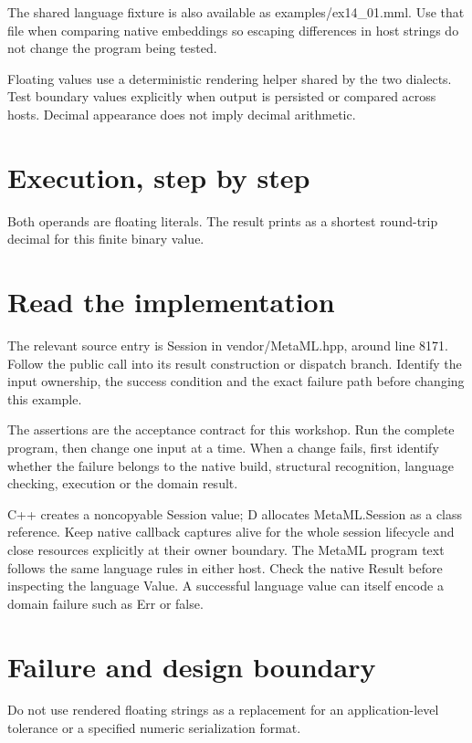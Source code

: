 The shared language fixture is also available as examples/ex14\_01.mml. Use that file when comparing native embeddings so escaping differences in host strings do not change the program being tested.

\clearpage
{}
Floating values use a deterministic rendering helper shared by the two dialects. Test boundary values explicitly when output is persisted or compared across hosts. Decimal appearance does not imply decimal arithmetic.


\section*{Execution, step by step}
Both operands are floating literals. The result prints as a shortest round-trip decimal for this finite binary value.

\section*{Read the implementation}
The relevant source entry is Session in vendor/MetaML.hpp, around line 8171. Follow the public call into its result construction or dispatch branch. Identify the input ownership, the success condition and the exact failure path before changing this example.

The assertions are the acceptance contract for this workshop. Run the complete program, then change one input at a time. When a change fails, first identify whether the failure belongs to the native build, structural recognition, language checking, execution or the domain result.

\clearpage
{}
C++ creates a noncopyable Session value; D allocates MetaML.Session as a class reference. Keep native callback captures alive for the whole session lifecycle and close resources explicitly at their owner boundary. The MetaML program text follows the same language rules in either host. Check the native Result before inspecting the language Value. A successful language value can itself encode a domain failure such as Err or false.


\section*{Failure and design boundary}
Do not use rendered floating strings as a replacement for an application-level tolerance or a specified numeric serialization format.


